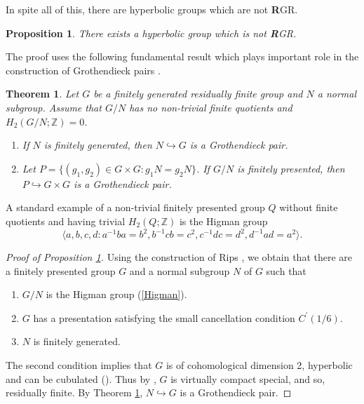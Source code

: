 \documentclass{amsart}
\newtheorem{teo}[lem]{Theorem}
\newtheorem{pro}[lem]{Proposition}
\theoremstyle{definition}
\theoremstyle{remark}
\newcommand{\Z}{\mathbb{Z}}
\begin{document}
In spite all of this, there are hyperbolic groups which are not {\textbf R}GR. 


   \begin{pro} \label{hyperbolic}
  There exists a hyperbolic group which is not  {\textbf R}GR. \end{pro}
 
 
 The proof uses the following fundamental result which plays important role in the construction of Grothendieck pairs    \cite{PT86,BL00, BG04}.
  \begin{teo} \label{criterionGP}
 Let $G$ be a finitely generated residually finite group and $N$ a normal subgroup. Assume that $G/N$ has no non-trivial finite quotients and $H_2(G/N;\Z)=0$.
\begin{enumerate}
\item[(a)]  If $N$ is finitely generated, then $N\hookrightarrow G$ is a Grothendieck pair.
\item [(b)] Let $P=\{(g_1,g_2)\in G\times G\colon g_1N=g_2N\}$. If $G/N$ is finitely presented, then $P\hookrightarrow  G\times G$ is a Grothendieck pair.
\end{enumerate} 
 \end{teo}
 A standard example of a non-trivial finitely presented group $Q$ without finite quotients and having trivial $H_2(Q;\Z)$ is the Higman group 
 \begin{equation} \label{Higman}
 \langle a,b,c,d:a^{-1}ba=b^2, b^{-1}cb=c^2,c^{-1}dc=d^2,d^{-1}ad=a^2\rangle.\end{equation}
 
 \begin{proof}[Proof of Proposition \ref{hyperbolic}]
 Using the construction of Rips \cite{Ri82}, we obtain that there are a finitely presented group $G$ and a normal subgroup $N$ of $G$ such that
 \begin{enumerate}
 \item[(i)] $G/N$ is the Higman group (\ref{Higman}).
 \item [(ii)] $G$ has a presentation satisfying the small cancellation condition $C^\prime(1/6)$.
 \item [(iii)] $N$ is finitely generated.
 \end{enumerate}
 The second condition implies that $G$ is of cohomological dimension 2, hyperbolic and can be cubulated (\cite{Wi04}). Thus  by \cite{Ag13},  $G$ is   virtually compact special, and so, residually finite. By  Theorem  \ref{criterionGP}, $ N\hookrightarrow G$ is a Grothendieck pair.
 \end{proof}
\end{document}
